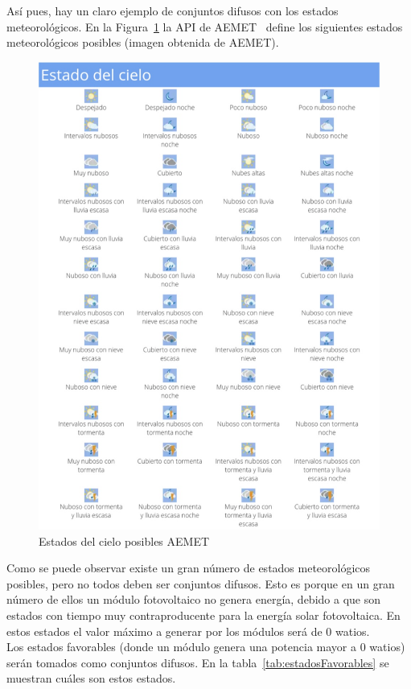 Así pues, hay un claro ejemplo de conjuntos difusos con los estados meteorológicos. En la Figura~\ref{fig:estadoCielo} la API de AEMET~\cite{Aemet} define los siguientes estados meteorológicos posibles (imagen obtenida de \textcopyright AEMET).
\begin{figure}[!h]
        \centering
        \includegraphics[width=17cm]{figs/estadoCieloAEMET.png}
        \caption{Estados del cielo posibles AEMET}
        \label{fig:estadoCielo}
\end{figure}
Como se puede observar existe un gran número de estados meteorológicos posibles, pero no todos deben ser conjuntos difusos. Esto es porque en un gran número de ellos un módulo fotovoltaico no genera energía, debido a que son estados con tiempo muy contraproducente para la energía solar fotovoltaica. En estos estados el valor máximo a generar por los módulos será de 0 watios.\\Los estados favorables (donde un módulo genera una potencia mayor a 0 watios) serán tomados como conjuntos difusos. En la tabla~\ref{tab:estadosFavorables} se muestran cuáles son estos estados.

